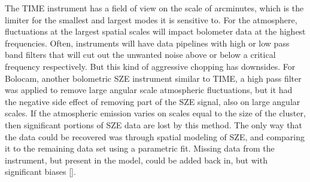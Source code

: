 \documentclass[manuscript]{aastex}
\begin{document}
The TIME instrument has a field of view on the scale of arcminutes, which is the limiter for the smallest and largest modes it is sensitive to. For the atmosphere, fluctuations at the largest spatial scales will impact bolometer data at the highest frequencies. Often, instruments will have data pipelines with high or low pass band filters that will cut out the unwanted noise above or below a critical frequency respectively. But this kind of aggressive chopping has downsides. For Bolocam, another bolometric SZE instrument similar to TIME, a high pass filter was applied to remove large angular scale atmospheric fluctuations, but it had the negative side effect of removing part of the SZE signal, also on large angular scales. If the atmospheric emission varies on scales equal to the size of the cluster, then significant portions of SZE data are lost by this method. The only way that the data could be recovered was through spatial modeling of SZE, and comparing it to the remaining data set using a parametric fit. Missing data from the instrument, but present in the model, could be added back in, but with significant biases [\cite{Sayers2013b}].
\end{document}
